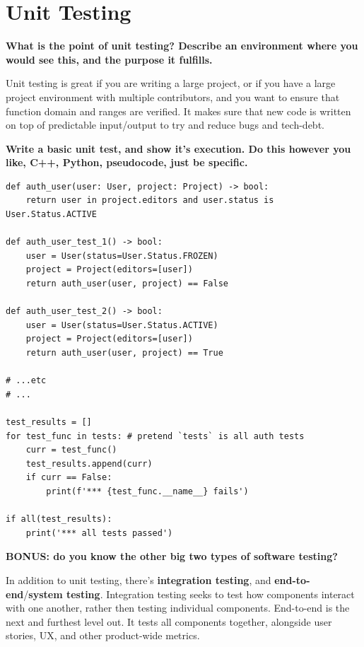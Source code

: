 \documentclass[12pt, letterpaper]{article}
\newcommand{\question}[1]{\textbf{#1}\par}
\newenvironment{answerblock}{\color{Green4}}{\normalcolor\vspace{1em}}
\begin{document}
\pagebreak
\section{Unit Testing}

\question{What is the point of unit testing? Describe an environment where you
would see this, and the purpose it fulfills.}

\begin{answerblock}
Unit testing is great if you are writing a large project, or if you have a
large project environment with multiple contributors, and you want to ensure
that function domain and ranges are verified. It makes sure that new code is
written on top of predictable input/output to try and reduce bugs and
tech-debt.
\end{answerblock}

\question{Write a basic unit test, and show it's execution. Do this
however you like, C++, Python, pseudocode, just be specific.}

\begin{verbatim}
def auth_user(user: User, project: Project) -> bool:
    return user in project.editors and user.status is User.Status.ACTIVE

def auth_user_test_1() -> bool:
    user = User(status=User.Status.FROZEN)
    project = Project(editors=[user])
    return auth_user(user, project) == False

def auth_user_test_2() -> bool:
    user = User(status=User.Status.ACTIVE)
    project = Project(editors=[user])
    return auth_user(user, project) == True

# ...etc
# ...

test_results = []
for test_func in tests: # pretend `tests` is all auth tests 
    curr = test_func()
    test_results.append(curr)
    if curr == False:
        print(f'*** {test_func.__name__} fails')

if all(test_results):
    print('*** all tests passed')
\end{verbatim}

\begin{minipage}{\textwidth}
\question{BONUS: do you know the other big two types of software testing?}

\begin{answerblock}
In addition to unit testing, there's \textbf{integration testing}, and
\textbf{end-to-end}/\textbf{system testing}. Integration testing seeks to test
how components interact with one another, rather then testing individual
components. End-to-end is the next and furthest level out. It tests all
components together, alongside user stories, UX, and other product-wide
metrics.
\end{answerblock}
\end{minipage}
\end{document}
